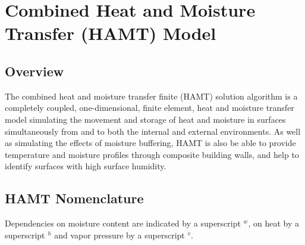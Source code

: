 \section{Combined Heat and Moisture Transfer (HAMT) Model}\label{combined-heat-and-moisture-transfer-hamt-model}

\subsection{Overview}\label{overview-011}

The combined heat and moisture transfer finite (HAMT) solution algorithm is a completely coupled, one-dimensional, finite element, heat and moisture transfer model simulating the movement and storage of heat and moisture in surfaces simultaneously from and to both the internal and external environments. As well as simulating the effects of moisture buffering, HAMT is also be able to provide temperature and moisture profiles through composite building walls, and help to identify surfaces with high surface humidity.

\subsection{HAMT Nomenclature}\label{hamt-nomenclature}

Dependencies on moisture content are indicated by a superscript \(^{w}\), on heat by a superscript \(^{h}\) and vapor pressure by a superscript \(^{v}\).

